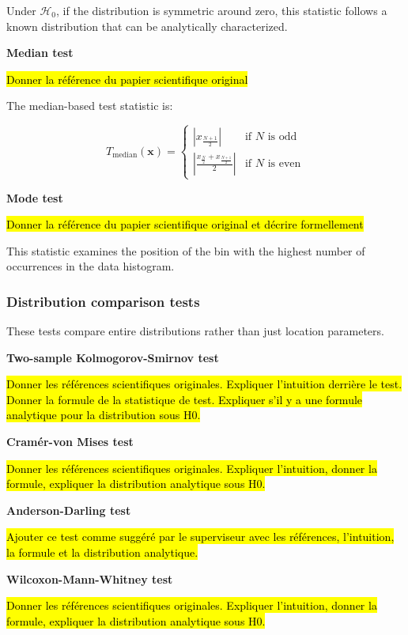 \documentclass{article}
\begin{document}
Under ${\mathcal{H}}_0$, if the distribution is symmetric around zero, this statistic follows a known distribution that can be analytically characterized.

\textbf{Median test}

\hl{Donner la référence du papier scientifique original}

The median-based test statistic is:

\begin{equation}
T_{\text{median}}(\mathbf{x}) = \begin{cases}
\left| x_{\frac{N+1}{2}} \right| & \text{if }N\text{ is odd} \\
\left| \frac{x_{\frac{N}{2}} + x_{\frac{N+1}{2}}}{2} \right|  & \text{if }N\text{ is even}
\end{cases}
\end{equation}

\textbf{Mode test}

\hl{Donner la référence du papier scientifique original et décrire formellement}

This statistic examines the position of the bin with the highest number of occurrences in the data histogram.

\subsubsection{Distribution comparison tests}

These tests compare entire distributions rather than just location parameters.

\textbf{Two-sample Kolmogorov-Smirnov test}

\hl{Donner les références scientifiques originales. Expliquer l'intuition derrière le test. Donner la formule de la statistique de test. Expliquer s'il y a une formule analytique pour la distribution sous H0.}

\textbf{Cramér-von Mises test}

\hl{Donner les références scientifiques originales. Expliquer l'intuition, donner la formule, expliquer la distribution analytique sous H0.}

\textbf{Anderson-Darling test}

\hl{Ajouter ce test comme suggéré par le superviseur avec les références, l'intuition, la formule et la distribution analytique.}

\textbf{Wilcoxon-Mann-Whitney test}

\hl{Donner les références scientifiques originales. Expliquer l'intuition, donner la formule, expliquer la distribution analytique sous H0.}
\end{document}
